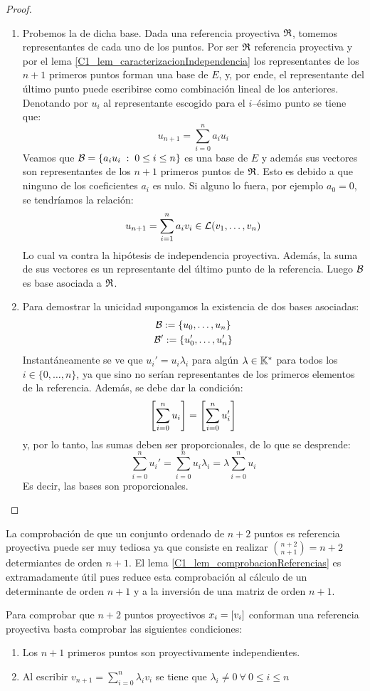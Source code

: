 \begin{proof}
	\begin{enumerate}
		\item Probemos la  de dicha base. Dada una referencia proyectiva $\mathfrak{R}$, tomemos representantes de cada uno de los puntos. Por ser $\mathfrak{R}$ referencia proyectiva y por el lema \ref{C1_lem_caracterizacionIndependencia} los representantes de los $n+1$ primeros puntos forman una base de $E$, y, por ende, el representante del último punto puede escribirse como combinación lineal de los anteriores. Denotando por $u_i$ al representante escogido para el $i$--ésimo punto se tiene que:
		\[u_{n+1}=\sum_{i=0}^{n}a_iu_i\]
		Veamos que $\mathcal{B}=\{a_iu_i\;:\; 0\leq i\leq n\}$ es una base de $E$ y además sus vectores son representantes de los $n+1$ primeros puntos de $\mathfrak{R}$. Esto es debido a que ninguno de los coeficientes $a_i$ es nulo. Si alguno lo fuera, por ejemplo $a_0=0$, se tendríamos la relación:
		\[
		u_{n+1}=\sum_{i=1}^{n}a_iv_i\in\mathcal{L}(v_1,\dots,v_n)
		\] Lo cual va contra la hipótesis de independencia proyectiva. Además, la suma de sus vectores es un representante del último punto de la referencia. Luego $\mathcal{B}$ es base asociada a $\mathfrak{R}$.
		\item Para demostrar la unicidad supongamos la existencia de dos bases asociadas:
		\begin{gather*}
			\mathcal{B}:=\{u_0,\dots,u_n\}\\
			\mathcal{B}':=\{u_0',\dots,u_n'\}
		\end{gather*}
		Instantáneamente se ve que $u_i'=u_i\lambda_i$ para algún $\lambda\in\mathbb{K}^*$ para todos los $i\in\{0,\dots,n\}$, ya que sino no serían representantes de los primeros elementos de la referencia. Además, se debe dar la condición:
		\[\left [ \sum_{i=0}^{n}u_i \right ]=\left [ \sum_{i=0}^{n}u_i' \right ]\] y, por lo tanto, las sumas deben ser proporcionales, de lo que se desprende:
		\[\sum_{i=0}^{n}u_i'=\sum_{i=0}^{n}u_i\lambda_i=\lambda\sum_{i=0}^{n}u_i\]
		Es decir, las bases son proporcionales.
	\end{enumerate}
\end{proof}
La comprobación de que un conjunto ordenado de $n+2$ puntos es referencia proyectiva puede ser muy tediosa ya que consiste en realizar $\binom{n+2}{n+1}=n+2$ determiantes de orden $n+1$. El lema \ref{C1_lem_comprobacionReferencias} es extramadamente útil pues reduce esta comprobación al cálculo de un determinante de orden $n+1$ y a la inversión de una matriz de orden $n+1$.
\begin{lem}
	\label{C1_lem_comprobacionReferencias}
	Para comprobar que $n+2$ puntos proyectivos $x_i=\left [ v_i \right ]$ conforman una referencia proyectiva basta comprobar las siguientes condiciones:\begin{enumerate}
		\item Los $n+1$ primeros puntos son proyectivamente independientes.
		\item Al escribir $v_{n+1}=\sum_{i=0}^{n}\lambda_iv_i$ se tiene que $\lambda_i\not=0\ \forall\ 0\leq i\leq n$
	\end{enumerate}
\end{lem}
